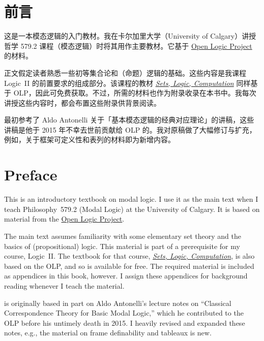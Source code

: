
\ifdefined\ollangid
\chapter{前言}

这是一本模态逻辑的入门教材。我在卡尔加里大学（University of Calgary）讲授哲学 579.2 课程（模态逻辑）时将其用作主要教材。它基于
\href{https://openlogicproject.org}{Open Logic Project} 的材料。

正文假定读者熟悉一些初等集合论和（命题）逻辑的基础。这些内容是我课程 Logic~II 的前置要求的组成部分。该课程的教材
\href{https://slc.openlogicproject.org}{\emph{Sets, Logic, Computation}} 同样基于 OLP，因此可免费获取。不过，所需的材料也作为附录收录在本书中。我每次讲授这些内容时，都会布置这些附录供背景阅读。

最初参考了 Aldo Antonelli 关于「基本模态逻辑的经典对应理论」的讲稿，这些讲稿是他于 2015 年不幸去世前贡献给 OLP 的。我对原稿做了大幅修订与扩充，例如，关于框架可定义性和表列的材料即为新增内容。
\else
\chapter{Preface}

This is an introductory textbook on modal logic. I use it as the main
text when I teach Philosophy~579.2 (Modal Logic) at the University of
Calgary. It is based on material from the
\href{https://openlogicproject.org}{Open Logic Project}.

The main text assumes familiarity with some elementary set theory and
the basics of (propositional) logic. This material is part of a
prerequisite for my course, Logic~II. The textbook for that course,
\href{https://slc.openlogicproject.org}{\emph{Sets, Logic,
Computation}}, is also based on the OLP, and so is available for free.
The required material is included as appendices in this book,
however. I assign these appendices for background reading whenever I
teach the material.

 is originally based in part on Aldo Antonelli's
lecture notes on ``Classical Correspondence Theory for Basic Modal
Logic,'' which he contributed to the OLP before his untimely death in
2015. I heavily revised and expanded these notes, e.g., the material
on frame definability and tableaux is new.
\fi
